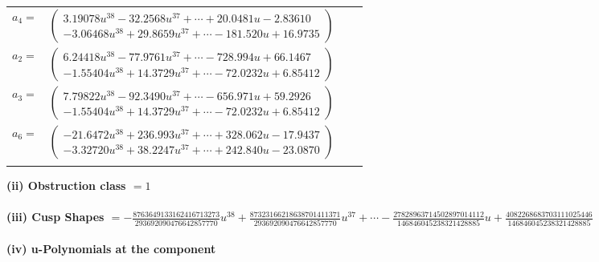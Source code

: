 \documentclass[1p]{elsarticle_modified}
\theoremstyle{definition}
\begin{document}
\begin{tabular}{m{7pt} m{180pt} m{7pt} m{180pt} }
\flushright $a_{4}=$&$\begin{pmatrix}3.19078 u^{38}-32.2568 u^{37}+\cdots+20.0481 u-2.83610\\-3.06468 u^{38}+29.8659 u^{37}+\cdots-181.520 u+16.9735\end{pmatrix}$ \\
\flushright $a_{2}=$&$\begin{pmatrix}6.24418 u^{38}-77.9761 u^{37}+\cdots-728.994 u+66.1467\\-1.55404 u^{38}+14.3729 u^{37}+\cdots-72.0232 u+6.85412\end{pmatrix}$ \\
\flushright $a_{3}=$&$\begin{pmatrix}7.79822 u^{38}-92.3490 u^{37}+\cdots-656.971 u+59.2926\\-1.55404 u^{38}+14.3729 u^{37}+\cdots-72.0232 u+6.85412\end{pmatrix}$ \\
\flushright $a_{6}=$&$\begin{pmatrix}-21.6472 u^{38}+236.993 u^{37}+\cdots+328.062 u-17.9437\\-3.32720 u^{38}+38.2247 u^{37}+\cdots+242.840 u-23.0870\end{pmatrix}$\\&\end{tabular}
\flushleft \textbf{(ii) Obstruction class $= 1$}\\~\\
\flushleft \textbf{(iii) Cusp Shapes $= -\frac{8763649133162416713273}{293692090476642857770} u^{38}+\frac{87323166218638701411371}{293692090476642857770} u^{37}+\cdots-\frac{27828963714502897014112}{146846045238321428885} u+\frac{4082268683703111025446}{146846045238321428885}$}\\~\\
\newpage\renewcommand{\arraystretch}{1}
\flushleft \textbf{(iv) u-Polynomials at the component}\newline \\
\end{document}
